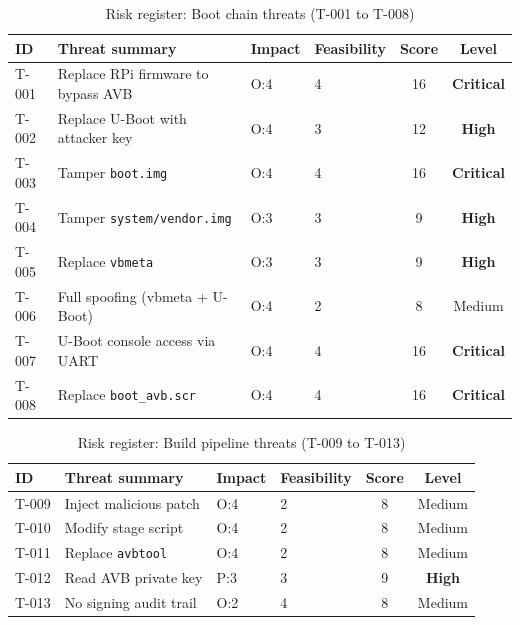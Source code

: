 \begin{table}[h]
\centering
\caption{Risk register: Boot chain threats (T-001 to T-008)}
\label{tab:risk_boot}
\small
\begin{tabularx}{\textwidth}{p{0.8cm} >{\raggedright\arraybackslash}X p{1.5cm} p{1.5cm} c c}
\toprule
\textbf{ID} & \textbf{Threat summary} & \textbf{Impact} & \textbf{Feasibility} & \textbf{Score} & \textbf{Level} \\
\midrule
T-001 & Replace RPi firmware to bypass AVB & O:4 & 4 & 16 & \textbf{Critical} \\
T-002 & Replace U-Boot with attacker key   & O:4 & 3 & 12 & \textbf{High} \\
T-003 & Tamper \texttt{boot.img}           & O:4 & 4 & 16 & \textbf{Critical} \\
T-004 & Tamper \texttt{system/vendor.img}  & O:3 & 3 &  9 & \textbf{High} \\
T-005 & Replace \texttt{vbmeta}            & O:3 & 3 &  9 & \textbf{High} \\
T-006 & Full spoofing (vbmeta + U-Boot)    & O:4 & 2 &  8 & Medium \\
T-007 & U-Boot console access via UART     & O:4 & 4 & 16 & \textbf{Critical} \\
T-008 & Replace \texttt{boot\_avb.scr}     & O:4 & 4 & 16 & \textbf{Critical} \\
\bottomrule
\end{tabularx}
\end{table}

\begin{table}[h]
\centering
\caption{Risk register: Build pipeline threats (T-009 to T-013)}
\label{tab:risk_build}
\small
\begin{tabularx}{\textwidth}{p{0.8cm} >{\raggedright\arraybackslash}X p{1.5cm} p{1.5cm} c c}
\toprule
\textbf{ID} & \textbf{Threat summary} & \textbf{Impact} & \textbf{Feasibility} & \textbf{Score} & \textbf{Level} \\
\midrule
T-009 & Inject malicious patch      & O:4 & 2 & 8 & Medium \\
T-010 & Modify stage script         & O:4 & 2 & 8 & Medium \\
T-011 & Replace \texttt{avbtool}    & O:4 & 2 & 8 & Medium \\
T-012 & Read AVB private key        & P:3 & 3 & 9 & \textbf{High} \\
T-013 & No signing audit trail      & O:2 & 4 & 8 & Medium \\
\bottomrule
\end{tabularx}
\end{table}

